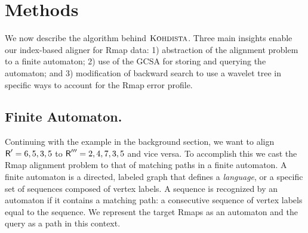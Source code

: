 
\section{Methods}\label{sec-meods}

We now describe the algorithm behind $\mbox{\rm {\sc Kohdista}}$.
Three main insights enable our index-based aligner for Rmap data: 1) abstraction of the alignment problem to a finite automaton; 2) use of the GCSA for storing and querying the automaton; and 3) modification of backward search to use a wavelet tree in specific ways to account for the Rmap error profile.  %

\subsection{Finite Automaton.}

Continuing with the example in the background section, we want to align $\mbox{\rm {\sf R}}' = 6,5,3,5$ to $\mbox{\rm {\sf R}}''' = 2,4,7,3,5$ and vice versa.  To accomplish this we cast the Rmap alignment problem to that of matching paths in a finite automaton.  A finite automaton is  a directed, labeled graph that defines a \emph{language}, or a specific set of sequences composed of vertex labels.  A sequence is recognized by an automaton if it contains a matching path: a consecutive sequence of vertex labels equal to the sequence. We represent the target Rmaps as an automaton and the query as a path in this context.  

